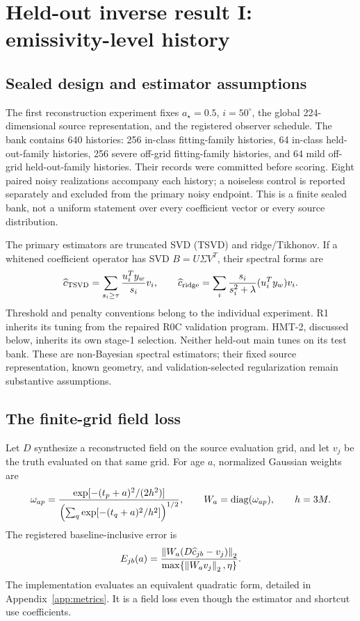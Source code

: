 \section{Held-out inverse result I: emissivity-level history}\label{sec:recovery}
\subsection{Sealed design and estimator assumptions}
The first reconstruction experiment fixes $a_\star=0.5$, $i=50^\circ$, the global 224-dimensional source representation, and the registered observer schedule. The bank contains 640 histories: 256 in-class fitting-family histories, 64 in-class held-out-family histories, 256 severe off-grid fitting-family histories, and 64 mild off-grid held-out-family histories. Their records were committed before scoring. Eight paired noisy realizations accompany each history; a noiseless control is reported separately and excluded from the primary noisy endpoint. This is a finite sealed bank, not a uniform statement over every coefficient vector or every source distribution.

The primary estimators are truncated SVD (TSVD) and ridge/Tikhonov. If a whitened coefficient operator has SVD $B=U\Sigma V^T$, their spectral forms are
\begin{equation}
\widehat c_{\rm TSVD}=\sum_{s_i\geq\tau}\frac{u_i^Ty_w}{s_i}v_i,
\qquad
\widehat c_{\rm ridge}=\sum_i\frac{s_i}{s_i^2+\lambda}(u_i^Ty_w)v_i.
\label{eq:estimators}
\end{equation}
Threshold and penalty conventions belong to the individual experiment. R1 inherits its tuning from the repaired R0C validation program. HMT-2, discussed below, inherits its own stage-1 selection. Neither held-out main tunes on its test bank. These are non-Bayesian spectral estimators; their fixed source representation, known geometry, and validation-selected regularization remain substantive assumptions.

\subsection{The finite-grid field loss}
Let $D$ synthesize a reconstructed field on the source evaluation grid, and let $v_j$ be the truth evaluated on that same grid. For age $a$, normalized Gaussian weights are
\begin{equation}
\omega_{ap}=\frac{\exp[-(t_p+a)^2/(2h^2)]}
{\left(\sum_q\exp[-(t_q+a)^2/h^2]\right)^{1/2}},\qquad
W_a=\operatorname{diag}(\omega_{ap}),\qquad h=3M.
\label{eq:window}
\end{equation}
The registered baseline-inclusive error is
\begin{equation}
E_{jb}(a)=\frac{\left\lVert W_a(D\widehat c_{jb}-v_j)\right\rVert_2}
{\max\{\left\lVert W_av_j\right\rVert_2,\eta\}}.
\label{eq:r1loss}
\end{equation}
The implementation evaluates an equivalent quadratic form, detailed in Appendix~\ref{app:metrics}. It is a field loss even though the estimator and shortcut use coefficients.

